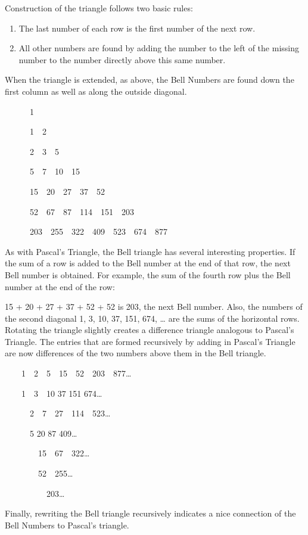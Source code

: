 \documentclass{article}
\begin{document}
Construction of the triangle follows two basic rules:

\begin{enumerate}
\item The last number of each row is the first number of the next row. 
\item All other numbers are found by adding the number to the left of the missing number to the number directly above
this same number.
\end{enumerate}
When the triangle is extended, as above, the Bell Numbers are found down the first column as well as along the outside
diagonal.

\ \ \ \ \ \ 1

\ \ \ \ \ \ 1\ \ 2

\ \ \ \ \ \ 2\ \ 3\ \ 5

\ \ \ \ \ \ 5\ \ 7\ \ 10\ \ 15

\ \ \ \ \ \ 15\ \ 20\ \ 27\ \ 37\ \ 52

\ \ \ \ \ \ 52\ \ 67\ \ 87\ \ 114\ \ 151\ \ 203

\ \ \ \ \ \ 203\ \ 255\ \ 322\ \ 409\ \ 523\ \ 674\ \ 877

As with Pascal’s Triangle, the Bell triangle has several interesting properties. If the sum of a row is added to the
Bell number at the end of that row, the next Bell number is obtained. For example, the sum of the fourth row plus the
Bell number at the end of the row: 

15 + 20 + 27 + 37 + 52 + 52 is 203, the next Bell number. Also, the numbers of the second diagonal 1, 3, 10, 37, 151,
674, … are the sums of the horizontal rows. Rotating the triangle slightly creates a difference triangle analogous to
Pascal’s Triangle. The entries that are formed recursively by adding in Pascal’s Triangle are now differences of the
two numbers above them in the Bell triangle.

\ \ \ \ 1\ \ 2\ \ 5\ \ 15\ \ 52\ \ 203\ \ 877…

\ \ \ \   1\ \   3\ \   10  37  151  674…

\ \ \ \ \ \ 2\ \ 7\ \ 27\ \ 114\ \ 523…

\ \ \ \ \ \   5  20  87  409…

\ \ \ \ \ \ \ \ 15\ \ 67\ \ 322…

\ \ \ \ \ \ \ \   52\ \   255…

\ \ \ \ \ \ \ \ \ \ 203…

Finally, rewriting the Bell triangle recursively indicates a nice connection of the Bell Numbers to Pascal’s triangle. 
\end{document}
